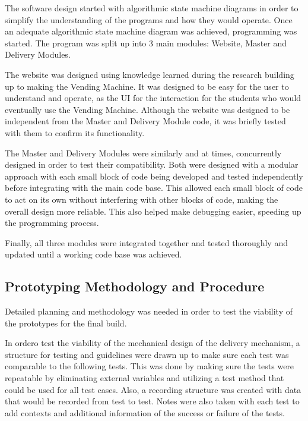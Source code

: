 \documentclass[a4paper,11pt]{article}
\numberwithin{figure}{section}
\numberwithin{table}{section}
\begin{document}
The software design started with algorithmic state machine diagrams in order to simplify the understanding of the programs and how they would operate. Once an adequate algorithmic state machine diagram was achieved, programming was started. The program was split up into 3 main modules: Website, Master and Delivery Modules. 

The website was designed using knowledge learned during the research building up to making the Vending Machine. It was designed to be easy for the user to understand and operate, as the UI for the interaction for the students who would eventually use the Vending Machine. Although the website was designed to be independent from the Master and Delivery Module code, it was briefly tested with them to confirm its functionality.

The Master and Delivery Modules were similarly and at times, concurrently designed in order to test their compatibility. Both were designed with a modular approach with each small block of code being developed and tested independently before integrating with the main code base. This allowed each small block of code to act on its own without interfering with other blocks of code, making the overall design more reliable. This also helped make debugging easier, speeding up the programming process.

Finally, all three modules were integrated together and tested thoroughly and updated until a working code base was achieved. 

\subsection[Prototyping Methodology and Procedure]{Prototyping Methodology and Procedure%
}

Detailed planning and methodology was needed in order to test the viability of the prototypes for the final build.

In ordero test the viability of the mechanical design of the delivery mechanism, a structure for testing and guidelines were drawn up to make sure each test was comparable to the following tests. This was done by making sure the tests were repeatable by eliminating external variables and utilizing a test method that could be used for all test cases. Also, a recording structure was created with data that would be recorded from test to test. Notes were also taken with each test to add contexts and additional information of the success or failure of the tests.
\end{document}
